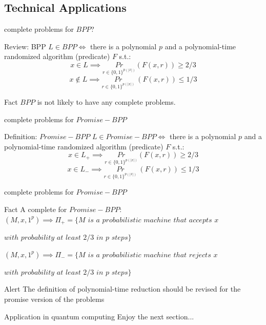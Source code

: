     \subsection{Technical Applications}
        \begin{frame}{complete problems for $BPP$?}
            \begin{block}{Review: BPP}
                $L \in BPP \iff $ there is a polynomial $p$ and a polynomial-time randomized algorithm (predicate) $F$ s.t.:
                $$x \in L \implies \underset{r\in \{0,1\}^{p(|x|)}}{Pr}(F(x,r)) \geq 2/3$$
                $$x \notin L \implies \underset{r\in \{0,1\}^{p(|x|)}}{Pr}\ (F(x,r)) \leq 1/3$$
            \end{block}
            \pause
            \begin{block}{Fact}   
                $BPP$ is not likely to have any complete problems.
            \end{block}
        \end{frame}
        \begin{frame}{complete problems for $Promise-BPP$}
            \begin{block}{Definition: $Promise-BPP$}
                $L \in Promise-BPP \iff $ there is a polynomial $p$ and a polynomial-time randomized algorithm (predicate) $F$ s.t.:
                $$x \in L_+ \implies \underset{r\in \{0,1\}^{p(|x|)}}{Pr}(F(x,r)) \geq 2/3$$
                $$x \in L_- \implies \underset{r\in \{0,1\}^{p(|x|)}}{Pr}\ (F(x,r)) \leq 1/3$$
            \end{block}
        \end{frame}
        
        \begin{frame}{complete problems for $Promise-BPP$}
            \begin{block}{Fact}
                A complete for $Promise-BPP$:\\
                $(M,x,1^p) \implies \Pi_+ =\{M$ $is$ $a$ $probabilistic$ $machine$ $that$ $accepts$ $x$
                
                \hfill $with$ $probability$ $at$ $least$ $2/3$ $in$ $p$ $steps\}$

                $(M,x,1^p) \implies \Pi_- =\{M$ $is$ $a$ $probabilistic$ $machine$ $that$ $rejects$ $x$
                
                \hspace{100pt} $with$ $probability$ $at$ $least$ $2/3$ $in$ $p$ $steps\}$
            \end{block}
            \pause
            \begin{alertblock}{Alert}
                The definition of polynomial-time reduction should be revised for the promise version of the problems
            \end{alertblock}
        \end{frame}
        
        \begin{frame}{Application in quantum computing}
            \huge{Enjoy the next section...}
        \end{frame}